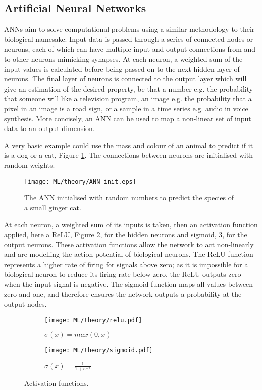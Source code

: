 \subsection{Artificial Neural Networks}
\acp{ANN} aim to solve computational problems using a similar methodology to their biological namesake. Input data is passed through a series of connected nodes or neurons, each of which can have multiple input and output connections from and to other neurons mimicking synapses. At each neuron, a weighted sum of the input values is calculated before being passed on to the next hidden layer of neurons. The final layer of neurons is connected to the output layer which will give an estimation of the desired property, be that a number e.g. the probability that someone will like a television program, an image e.g. the probability that a pixel in an image is a road sign, or a sample in a time series e.g. audio in voice synthesis. More concisely, an \ac{ANN} can be used to map a non-linear set of input data to an output dimension.

A very basic example could use the mass and colour of an animal to predict if it is a dog or a cat, Figure \ref{fig:ml_theory_init}. The connections between neurons are initialised with random weights. 

\begin{figure}[H]
	\centering
	\texttt{[image: ML/theory/ANN\_init.eps]}
	\caption{The \ac{ANN} initialised with random numbers to predict the species of a small ginger cat.}
	\label{fig:ml_theory_init}	
\end{figure}

At each neuron, a weighted sum of its inputs is taken, then an activation function applied, here a \ac{ReLU}, Figure \ref{fig:ml_theory_activation_relu}, for the hidden neurons and sigmoid, \ref{fig:ml_theory_activation_sigmoid}, for the output neurons. These activation functions allow the network to act non-linearly and are modelling the action potential of biological neurons. The \ac{ReLU} function represents a higher rate of firing for signals above zero; as it is impossible for a biological neuron to reduce its firing rate below zero, the \ac{ReLU} outputs zero when the input signal is negative. The sigmoid function maps all values between zero and one, and therefore ensures the network outputs a probability at the output nodes.

\begin{figure}[H]
	\centering
	\begin{subfigure}[c]{0.47\textwidth}
		\centering
		\texttt{[image: ML/theory/relu.pdf]}
		\caption{$\sigma (x) = max(0, x)$}
		\label{fig:ml_theory_activation_relu}
	\end{subfigure}
	\hfill
	\begin{subfigure}[c]{0.47\textwidth}
		\centering
		\texttt{[image: ML/theory/sigmoid.pdf]}
		\caption{$\sigma(x) = \frac{1}{1 + e^{-x}}$}
		\label{fig:ml_theory_activation_sigmoid}
	\end{subfigure}
	\caption{Activation functions.}
	\label{fig:ml_theory_activation}
\end{figure}

